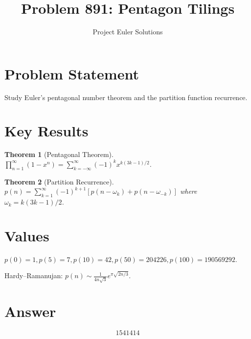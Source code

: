 \documentclass[11pt]{article}
\title{Problem 891: Pentagon Tilings}
\author{Project Euler Solutions}
\date{}
\newtheorem{theorem}{Theorem}
\begin{document}
\maketitle

\section{Problem Statement}
Study Euler's pentagonal number theorem and the partition function recurrence.

\section{Key Results}

\begin{theorem}[Pentagonal Theorem]
$\prod_{n=1}^{\infty}(1-x^n) = \sum_{k=-\infty}^{\infty}(-1)^k x^{k(3k-1)/2}$.
\end{theorem}

\begin{theorem}[Partition Recurrence]
$p(n) = \sum_{k=1}^{\infty} (-1)^{k+1}[p(n-\omega_k) + p(n-\omega_{-k})]$
where $\omega_k = k(3k-1)/2$.
\end{theorem}

\section{Values}
$p(0)=1, p(5)=7, p(10)=42, p(50)=204226, p(100)=190569292$.

Hardy--Ramanujan: $p(n) \sim \frac{1}{4n\sqrt{3}} e^{\pi\sqrt{2n/3}}$.

\section{Answer}

\[
\boxed{1541414}
\]
\end{document}
